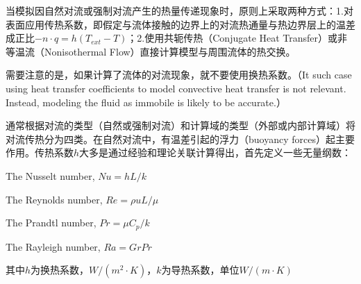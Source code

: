 当模拟因自然对流或强制对流产生的热量传递现象时，原则上采取两种方式：1.对表面应用传热系数，即假定与流体接触的边界上的对流热通量与热边界层上的温差成正比$-n\cdot q = h(T_{ext}-T)$；2.使用共轭传热（Conjugate Heat Transfer）或非等温流（Nonisothermal
Flow）直接计算模型与周围流体的热交换。

需要注意的是，如果计算了流体的对流现象，就不要使用换热系数。（It such case using heat transfer coefficients to model convective heat transfer is not relevant. Instead, modeling the fluid as immobile is likely to be accurate.）

通常根据对流的类型（自然或强制对流）和计算域的类型（外部或内部计算域）将对流传热分为四类。在自然对流中，有温差引起的浮力（buoyancy forces）起主要作用。传热系数$h$大多是通过经验和理论关联计算得出，首先定义一些无量纲数：

The Nusselt number, $Nu=hL/k$

The Reynolds number, $Re=\rho uL/\mu$

The Prandtl number, $Pr=\mu C_{p}/k$

The Rayleigh number, $Ra=GrPr$

其中$h$为换热系数，$W/(m^2 \cdot K)$，$k$为导热系数，单位$W/(m\cdot K)$


